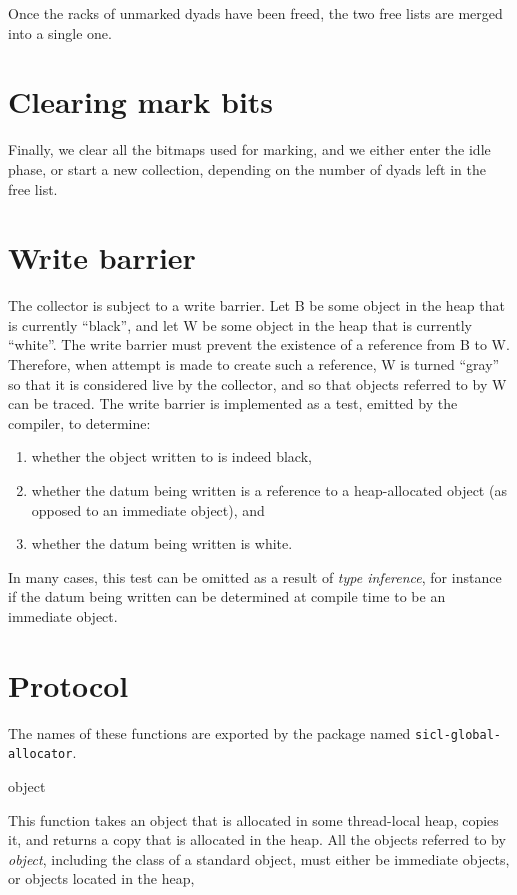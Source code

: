 Once the racks of unmarked dyads have been freed, the two free lists
are merged into a single one.

\section{Clearing mark bits}

Finally, we clear all the bitmaps used for marking, and we either
enter the idle phase, or start a new collection, depending on the
number of dyads left in the free list.

\section{Write barrier}

The collector is subject to a write barrier.  Let B be some object in
the heap that is currently ``black'', and let W be some object in the
heap that is currently ``white''.  The write barrier must prevent the
existence of a reference from B to W.  Therefore, when attempt is made
to create such a reference, W is turned ``gray'' so that it is
considered live by the collector, and so that objects referred to by W
can be traced.  The write barrier is implemented as a test, emitted by
the compiler, to determine:

\begin{enumerate}
\item whether the object written to is indeed black,
\item whether the datum being written is a reference to a
  heap-allocated object (as opposed to an immediate object), and
\item whether the datum being written is white.
\end{enumerate}

In many cases, this test can be omitted as a result of \emph{type
  inference}, for instance if the datum being written can be
determined at compile time to be an immediate object.

\section{Protocol}

The names of these functions are exported by the package named
\texttt{sicl-global-allocator}.

 {object}

This function takes an object that is allocated in some thread-local
heap, copies it, and returns a copy that is allocated in the
heap.  All the objects referred to by \textit{object}, including the
class of a standard object, must either be immediate objects, or
objects located in the heap,


